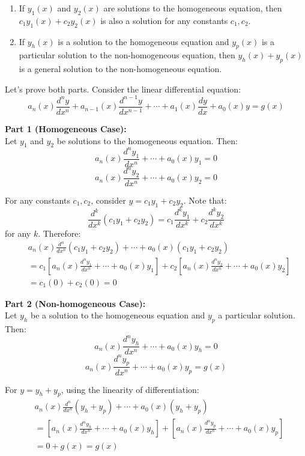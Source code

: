 \begin{enumerate}
    \item If $y_1(x)$ and $y_2(x)$ are solutions to the homogeneous equation, then $c_1y_1(x) + c_2y_2(x)$ is also a solution for any constants $c_1, c_2$.
    
    \item If $y_h(x)$ is a solution to the homogeneous equation and $y_p(x)$ is a particular solution to the non-homogeneous equation, then $y_h(x) + y_p(x)$ is a general solution to the non-homogeneous equation.
\end{enumerate}

\noindent Let's prove both parts. Consider the linear differential equation:
\[
a_n(x)\frac{d^ny}{dx^n} + a_{n-1}(x)\frac{d^{n-1}y}{dx^{n-1}} + \cdots + a_1(x)\frac{dy}{dx} + a_0(x)y = g(x)
\]

\noindent \textbf{Part 1 (Homogeneous Case):} \\
Let $y_1$ and $y_2$ be solutions to the homogeneous equation. Then:
\[
a_n(x)\frac{d^ny_1}{dx^n} + \cdots + a_0(x)y_1 = 0
\]
\[
a_n(x)\frac{d^ny_2}{dx^n} + \cdots + a_0(x)y_2 = 0
\]

\noindent For any constants $c_1, c_2$, consider $y = c_1y_1 + c_2y_2$. Note that:
\[
\frac{d^k}{dx^k}(c_1y_1 + c_2y_2) = c_1\frac{d^ky_1}{dx^k} + c_2\frac{d^ky_2}{dx^k}
\]
for any $k$. Therefore:
\begin{align*}
&a_n(x)\frac{d^n}{dx^n}(c_1y_1 + c_2y_2) + \cdots + a_0(x)(c_1y_1 + c_2y_2) \\
&= c_1[a_n(x)\frac{d^ny_1}{dx^n} + \cdots + a_0(x)y_1] + c_2[a_n(x)\frac{d^ny_2}{dx^n} + \cdots + a_0(x)y_2] \\
&= c_1(0) + c_2(0) = 0
\end{align*}

\noindent \textbf{Part 2 (Non-homogeneous Case):} \\
Let $y_h$ be a solution to the homogeneous equation and $y_p$ a particular solution. Then:
\[
a_n(x)\frac{d^ny_h}{dx^n} + \cdots + a_0(x)y_h = 0
\]
\[
a_n(x)\frac{d^ny_p}{dx^n} + \cdots + a_0(x)y_p = g(x)
\]

\noindent For $y = y_h + y_p$, using the linearity of differentiation:
\begin{align*}
&a_n(x)\frac{d^n}{dx^n}(y_h + y_p) + \cdots + a_0(x)(y_h + y_p) \\
&= [a_n(x)\frac{d^ny_h}{dx^n} + \cdots + a_0(x)y_h] + [a_n(x)\frac{d^ny_p}{dx^n} + \cdots + a_0(x)y_p] \\
&= 0 + g(x) = g(x)
\end{align*}

